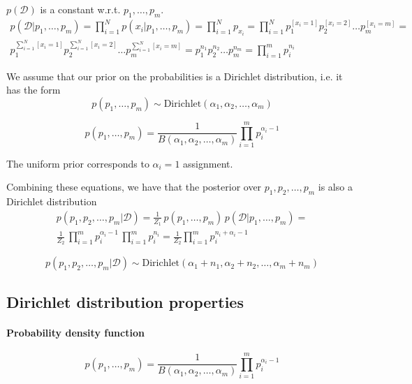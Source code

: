 \documentclass{article}
\begin{document}
$p(\mathcal{D})$ is a constant w.r.t. $p_1, \ldots, p_m$.
\begin{multline}
p(\mathcal{D}|p_1, \ldots, p_m) = \prod_{i=1}^{N}{p(x_i|p_1, \ldots, p_m)} = \prod_{i=1}^{N}{p_{x_i}} = \prod_{i=1}^{N}{p_1^{[x_i = 1]} p_2^{[x_i = 2]} \ldots p_m^{[x_i = m]}} = \\ p_1^{\sum_{i=1}^N{[x_i = 1]}} p_2^{\sum_{i=1}^N{[x_i = 2]}} \ldots p_m^{\sum_{i=1}^N{[x_i = m]}} = p_1^{n_1} p_2^{n_2} \ldots p_m^{n_m} = \prod_{i = 1}^m{p_i^{n_i}}
\end{multline}

We assume that our prior on the probabilities is a Dirichlet distribution, i.e. it has the form 
\begin{equation*}
p(p_1, \ldots, p_m) \sim \textrm{Dirichlet}(\alpha_1, \alpha_2, \ldots, \alpha_m)
\end{equation*}

\begin{equation}
p(p_1, \ldots, p_m) = \frac{1}{B(\alpha_1, \alpha_2, \ldots, \alpha_m)} \prod_{i=1}^m{p_i^{\alpha_i - 1}}
\end{equation}

The uniform prior corresponds to $\alpha_i = 1$ assignment.

Combining these equations, we have that the posterior over $p_1, p_2, \ldots, p_m$ is also a Dirichlet distribution
\begin{multline}
p(p_1, p_2, \ldots, p_m|\mathcal{D}) = \frac{1}{Z_1}\,p(p_1, \ldots, p_m)\,p(\mathcal{D}|p_1, \ldots, p_m) = \\ \frac{1}{Z_2} \, \prod_{i=1}^m{p_i^{\alpha_i - 1}} \, \prod_{i=1}^m{p_i^{n_i}} = \frac{1}{Z_2}{ \prod_{i=1}^m{p_i^{n_i + \alpha_i - 1}}}
\end{multline}

\begin{equation*}
p(p_1, p_2, \ldots, p_m|\mathcal{D}) \sim \textrm{Dirichlet}(\alpha_1 + n_1, \alpha_2 + n_2, \ldots, \alpha_m + n_m)
\end{equation*}

\subsection{Dirichlet distribution properties}

\paragraph{Probability density function}
\begin{equation}
p(p_1, \ldots, p_m) = \frac{1}{B(\alpha_1, \alpha_2, \ldots, \alpha_m)} \prod_{i=1}^m{p_i^{\alpha_i - 1}}
\end{equation}
\end{document}
